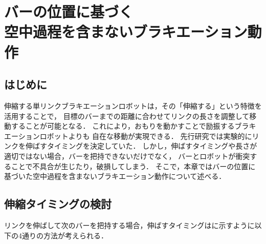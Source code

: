 \chapter[バーの位置に基づく空中過程を含まないブラキエーション動作]%
{バーの位置に基づく\\空中過程を含まないブラキエーション動作}
        \section{はじめに}
        
        伸縮する単リンクブラキエーションロボットは，その「伸縮する」という特徴を活用することで，
        目標のバーまでの距離に合わせてリンクの長さを調整して移動することが可能となる．
        これにより，おもりを動かすことで励振するブラキエーションロボット\cite{akahane2022single}よりも
        自在な移動が実現できる．
        先行研究\cite{Hijiri:Robomech2024}では実験的にリンクを伸ばすタイミングを決定していた．
        しかし，伸ばすタイミングや長さが適切ではない場合，バーを把持できないだけでなく，
        バーとロボットが衝突することで不具合が生じたり，破損してしまう．
        そこで，本章ではバーの位置に基づいた空中過程を含まないブラキエーション動作について述べる．
          
        \section{伸縮タイミングの検討}

        リンクを伸ばして次のバーを把持する場合，伸ばすタイミングはに示すように以下の4通りの方法が考えられる．

